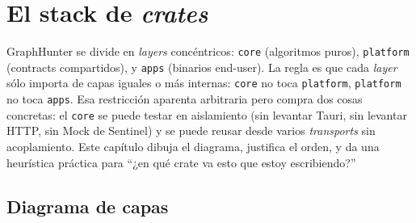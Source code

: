 \chapter{El stack de \emph{crates}}
\label{cap:stack}

\begin{intuicion}
GraphHunter se divide en \emph{layers} concéntricos: \texttt{core}
(algoritmos puros), \texttt{platform} (contracts compartidos), y
\texttt{apps} (binarios end-user). La regla es que cada \emph{layer}
sólo importa de capas iguales o más internas: \texttt{core} no toca
\texttt{platform}, \texttt{platform} no toca \texttt{apps}. Esa
restricción aparenta arbitraria pero compra dos cosas concretas: el
\texttt{core} se puede testar en aislamiento (sin levantar Tauri,
sin levantar HTTP, sin Mock de Sentinel) y se puede reusar desde
varios \emph{transports} sin acoplamiento. Este capítulo dibuja el
diagrama, justifica el orden, y da una heurística práctica para
``¿en qué crate va esto que estoy escribiendo?''
\end{intuicion}

\section{Diagrama de capas}

